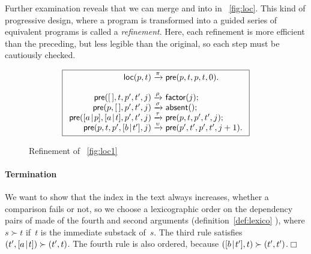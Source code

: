 Further examination reveals that we can merge
 and
 into
 in \fig~\vref{fig:loc}. This kind of progressive
design, where a program is transformed into a guided series of
equivalent programs is called a \emph{refinement}. Here, each
refinement is more efficient than the preceding, but less legible than
the original, so each step must be cautiously checked.
\begin{figure}[h]
\begin{equation*}
\boxed{%
\begin{array}{r@{\;}l@{\;}l}
\fun{loc}(p,t)   & \xrightarrow{\smash{\pi}} & \fun{pre}(p,t,p,t,0).\\
\\
\fun{pre}(\el,t,p',t',j) & \xrightarrow{\smash{\rho}}
                         & \fun{factor}(j);\\
\fun{pre}(p,\el,p',t',j) & \xrightarrow{\smash{\sigma}}
                         & \fun{absent}();\\
\fun{pre}(\cons{a}{p},\cons{a}{t},p',t',j)
                         & \xrightarrow{\smash{\tau}}
                         & \fun{pre}(p,t,p',t',j);\\
\fun{pre}(p,t,p',\cons{b}{t'},j) & \xrightarrow{\smash{\upsilon}}
                         & \fun{pre}(p',t',p',t',j+1).
\end{array}}
\end{equation*}
\caption{Refinement of \fig~\vref{fig:loc1}
\label{fig:loc}}
\end{figure}

\paragraph{Termination}

We want to show that the index in the text always increases, whether a
comparison fails or not, so we choose a lexicographic order on the
dependency pairs of 
made of the fourth and second arguments (definition~\eqref{def:lexico}
), where \(s \succ t\) if~\(t\) is the immediate
substack of~\(s\). The third rule satisfies \((t',[{a}\!\mid\!{t}]) \succ
(t',t)\). The fourth rule is also ordered, because \(([{b}\!\mid\!{t'}],t)
\succ (t',t')\).\hfill\(\Box\)

